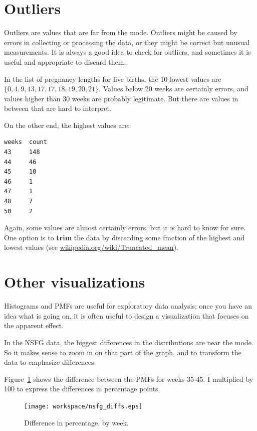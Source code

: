 \documentclass[12pt]{book}
\begin{document}
\section{Outliers}

Outliers are values that are far from the mode.  Outliers might be
caused by errors in collecting or processing the data, or they might
be correct but unusual measurements.  It is always a good idea to
check for outliers, and sometimes it is useful and appropriate to
discard them.


In the list of pregnancy lengths for live births, the 10 lowest values
are $\{ 0, 4, 9, 13, 17, 17, 18, 19, 20, 21 \}$.  Values below 20
weeks are certainly errors, and values higher than 30 weeks are
probably legitimate.  But there are values in between that are
hard to interpret.

On the other end, the highest values are:

\begin{verbatim}
weeks  count
43     148
44     46
45     10
46     1
47     1
48     7
50     2
\end{verbatim}

Again, some values are almost certainly errors,
but it is hard to know for sure.  One option is to {\bf trim} the data
by discarding some fraction of the highest and lowest values (see
\url{wikipedia.org/wiki/Truncated_mean}).


\section{Other visualizations}

Histograms and PMFs are useful for exploratory data analysis;
once you have an idea what is going on, it is often useful to
design a visualization that focuses on the apparent effect.

In the NSFG data, the biggest differences in the distributions are
near the mode.  So it makes sense to zoom in on that part of the
graph, and to transform the data to emphasize differences.

Figure~\ref{nsfg_diffs} shows the difference between the PMFs for weeks
35-45.  I multiplied by 100 to express the differences in percentage
points.

\begin{figure}
\centerline{\texttt{[image: workspace/nsfg\_diffs.eps]}}
\caption{Difference in percentage, by week.}
\label{nsfg_diffs}
\end{figure}
\end{document}

